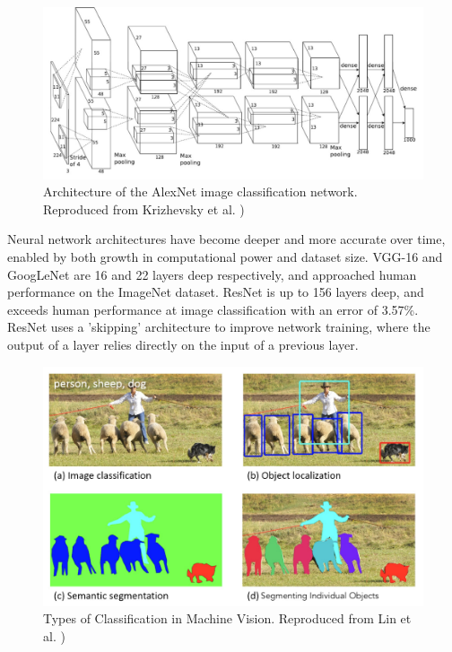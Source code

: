 \documentclass[12pt]{article}
\begin{document}
\begin{figure}[bp]
    \centering
    \includegraphics[width=0.8\linewidth]{images/alexnet_architecture.png}
    \caption{Architecture of the AlexNet image classification network. Reproduced from Krizhevsky et al. \cite{krizhevskyImageNetClassificationDeep2012})}
    \label{fig:alexnet_architecture}
\end{figure}

Neural network architectures have become deeper and more accurate over time, enabled by both
growth in computational power and dataset size. VGG-16 \cite{simonyanVeryDeepConvolutional2014}
and GoogLeNet \cite{szegedyGoingDeeperConvolutions2014}
are 16 and 22 layers deep respectively, and approached
human performance on the ImageNet dataset. ResNet \cite{heDeepResidualLearning2016} is up to 156 layers deep,
and exceeds human performance at image classification with an error of 3.57\%.
ResNet uses a 'skipping' architecture to improve network training, where the output of a layer relies directly on
the input of a previous layer.

\begin{figure}[bp]
    \centering
    \includegraphics[width=0.6\linewidth]{images/classification_types.png}
    \caption{Types of Classification in Machine Vision. Reproduced from Lin et al. \cite{linMicrosoftCOCOCommon2014})}
    \label{fig:classification_types}
\end{figure}
\end{document}
